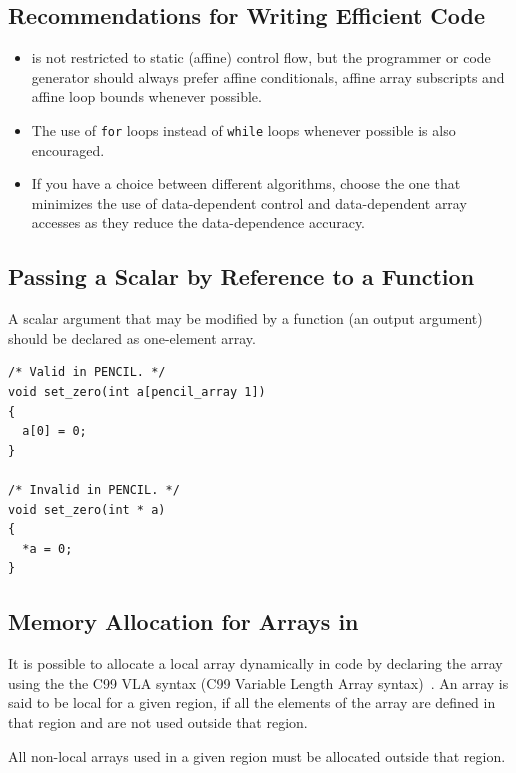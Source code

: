 \subsection{Recommendations for Writing Efficient \pencil Code}

\begin{itemize}
\item \pencil is not restricted to static (affine) control flow, but
  the programmer or code generator should always prefer affine
  conditionals, affine array subscripts and affine loop bounds
  whenever possible.
\item The use of \lstinline!for! loops instead of \lstinline!while!
  loops whenever possible is also encouraged.
\item If you have a choice between different algorithms, choose the
  one that minimizes the use of data-dependent control and
  data-dependent array accesses as they reduce the data-dependence
  accuracy.
\end{itemize}

\subsection{Passing a Scalar by Reference to a Function}

A scalar argument that may be modified by a function (an output argument)
should be declared as one-element array.

\begin{lstlisting}[language=pencil]
/* Valid in PENCIL. */
void set_zero(int a[pencil_array 1])
{
  a[0] = 0;
}

/* Invalid in PENCIL. */
void set_zero(int * a)
{
  *a = 0;
}
\end{lstlisting}  

\subsection{Memory Allocation for Arrays in \pencil}

It is possible to allocate a local array dynamically in \pencil code
by declaring the array using the the C99 VLA syntax (C99 Variable Length
Array syntax)~\cite{c99}. 
An array is said to be local for a given \pencil region, if all the
elements of the array are defined in that \pencil region and are not
used outside that region.

All non-local arrays used in a given \pencil region must be allocated
outside that \pencil region.

